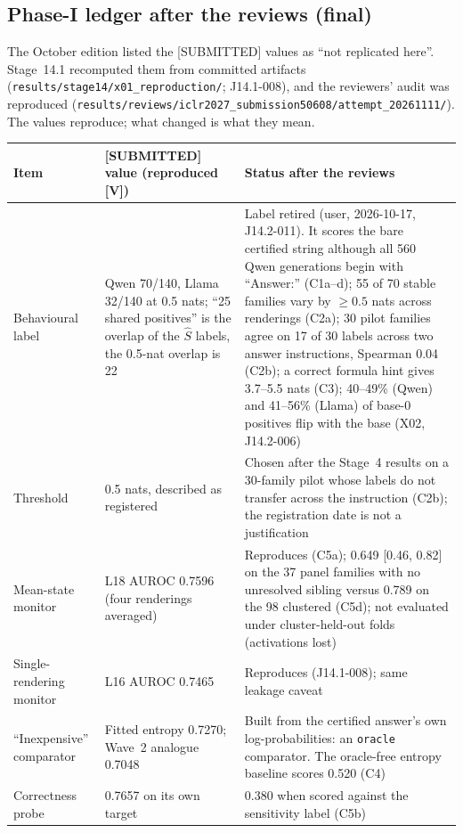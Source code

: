 \documentclass[10pt,a4paper]{article}
\newcommand{\tg}[1]{\textsc{[#1]}}
\begin{document}
\subsection{Phase-I ledger after the reviews (final)}
\label{sec:ledger}

The October edition listed the \tg{SUBMITTED} values as ``not replicated here''. Stage~14.1 recomputed them from
committed artifacts (\texttt{results/stage14/x01\_reproduction/}; J14.1-008), and the reviewers' audit was
reproduced (\texttt{results/reviews/iclr2027\_submission50608/attempt\_20261111/}). The values reproduce; what
changed is what they mean.

\begin{center}\small
\begin{longtable}{@{}P{2.8cm}P{5.6cm}P{7.4cm}@{}}
\toprule
Item & \tg{SUBMITTED} value (reproduced \tg{V}) & Status after the reviews \\
\midrule\endhead
Behavioural label & Qwen 70/140, Llama 32/140 at 0.5 nats; ``25 shared positives'' is the overlap of the $\hat S$ labels, the 0.5-nat overlap is 22 & Label retired (user, 2026-10-17, J14.2-011). It scores the bare certified string although all 560 Qwen generations begin with ``Answer:'' (C1a--d); 55 of 70 stable families vary by $\geq0.5$ nats across renderings (C2a); 30 pilot families agree on 17 of 30 labels across two answer instructions, Spearman 0.04 (C2b); a correct formula hint gives 3.7--5.5 nats (C3); 40--49\% (Qwen) and 41--56\% (Llama) of base-0 positives flip with the base (X02, J14.2-006) \\
Threshold & 0.5 nats, described as registered & Chosen after the Stage~4 results on a 30-family pilot whose labels do not transfer across the instruction (C2b); the registration date is not a justification \\
Mean-state monitor & L18 AUROC 0.7596 (four renderings averaged) & Reproduces (C5a); 0.649 [0.46, 0.82] on the 37 panel families with no unresolved sibling versus 0.789 on the 98 clustered (C5d); not evaluated under cluster-held-out folds (activations lost) \\
Single-rendering monitor & L16 AUROC 0.7465 & Reproduces (J14.1-008); same leakage caveat \\
``Inexpensive'' comparator & Fitted entropy 0.7270; Wave~2 analogue 0.7048 & Built from the certified answer's own log-probabilities: an \texttt{oracle} comparator. The oracle-free entropy baseline scores 0.520 (C4) \\
Correctness probe & 0.7657 on its own target & 0.380 when scored against the sensitivity label (C5b) \\

\end{longtable}
\end{center}
\end{document}
